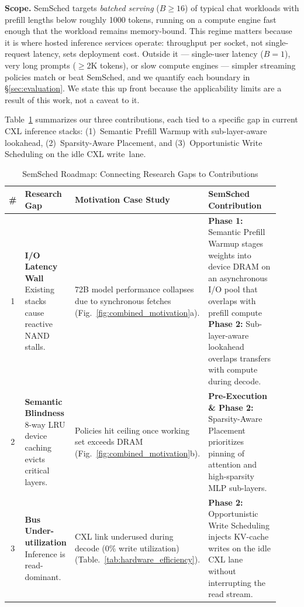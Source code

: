 \documentclass[10pt,conference,letterpaper]{IEEEtran}
\begin{document}
\noindent\textbf{Scope.} SemSched targets \emph{batched serving} ($B \ge 16$) of typical chat workloads with prefill lengths below roughly 1000 tokens, running on a compute engine fast enough that the workload remains memory-bound. This regime matters because it is where hosted inference services operate: throughput per socket, not single-request latency, sets deployment cost. Outside it --- single-user latency ($B{=}1$), very long prompts ($\ge$2K tokens), or slow compute engines --- simpler streaming policies match or beat SemSched, and we quantify each boundary in \S\ref{sec:evaluation}. We state this up front because the applicability limits are a result of this work, not a caveat to it.

\noindent Table~\ref{tab:gap_mapping} summarizes our three contributions, each tied to a specific gap in current CXL inference stacks: (1)~Semantic Prefill Warmup with sub-layer-aware lookahead, (2)~Sparsity-Aware Placement, and (3)~Opportunistic Write Scheduling on the idle CXL write~lane.

\begin{table}[t]
  \setlength{\abovecaptionskip}{0.1cm}
  \setlength{\belowcaptionskip}{-0.1cm}
\scriptsize
\centering
\caption{SemSched Roadmap: Connecting Research Gaps to Contributions}
\label{tab:gap_mapping}
\begin{tabular}{@{}c p{0.19\linewidth}p{0.2\linewidth}p{0.53\linewidth}@{}}
\toprule
\textbf{\#} & \textbf{Research Gap} & \textbf{Motivation Case Study} & \textbf{SemSched Contribution} \\
\midrule
1 & \textbf{I/O Latency Wall} Existing stacks cause reactive NAND stalls.
& 72B model performance collapses due to synchronous fetches (Fig.~\ref{fig:combined_motivation}a).
& \textbf{Phase 1:} Semantic Prefill Warmup stages weights into device DRAM on an asynchronous I/O pool that overlaps with prefill compute
\newline \textbf{Phase 2:} Sub-layer-aware lookahead overlaps transfers with compute during decode. \\
\midrule
2 & \textbf{Semantic Blindness} 8-way LRU device caching evicts critical layers.
& Policies hit ceiling once working set exceeds DRAM (Fig.~\ref{fig:combined_motivation}b).
& \textbf{Pre-Execution \& Phase 2:} Sparsity-Aware Placement prioritizes pinning of attention and high-sparsity MLP sub-layers. \\
\midrule
3 & \textbf{Bus Under-utilization} Inference is read-dominant.
& CXL link underused during decode (0\% write utilization) (Table.~\ref{tab:hardware_efficiency}).
& \textbf{Phase 2:} Opportunistic Write Scheduling injects KV-cache writes on the idle CXL lane without interrupting the read stream. \\
\bottomrule
\end{tabular}
\vspace{-3mm}
\end{table}
\end{document}
